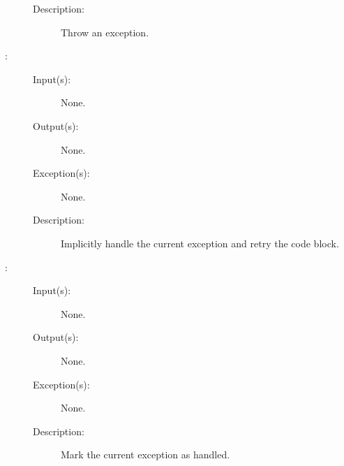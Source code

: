 \begin{description}
\begin{description}
\begin{description}
		\end{description}
	\item[Description: ]
		Throw an exception.
	\end{description}
\label{xep_retry}
\item[{\cfunc[void]{xep\_retry}{void}}: ]
	\begin{description}\item[]
	\item[Input(s): ] None.
	\item[Output(s): ] None.
	\item[Exception(s): ] None.
	\item[Description: ]
		Implicitly handle the current exception and retry the
		 code block.
	\end{description}
\label{xep_handled}
\item[{\cfunc[void]{xep\_handled}{void}}: ]
	\begin{description}\item[]
	\item[Input(s): ] None.
	\item[Output(s): ] None.
	\item[Exception(s): ] None.
	\item[Description: ]
		Mark the current exception as handled.
	\end{description}
\end{description}
